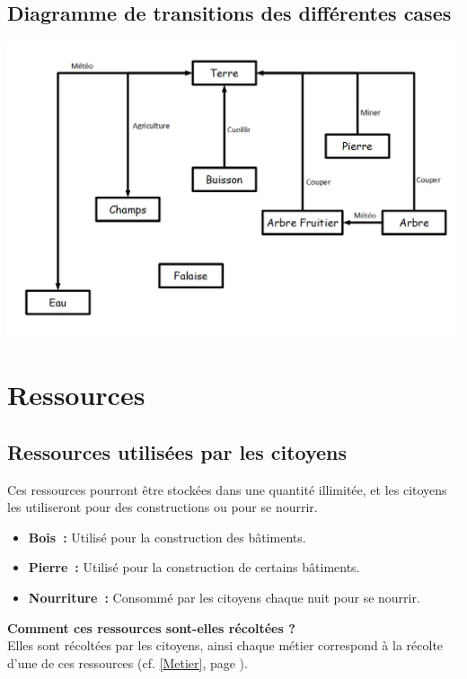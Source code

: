 \documentclass[a4paper]{article}
\begin{document}
      \subsection{Diagramme de transitions des différentes cases}
        \label{DiagCase}
        \begin{center}
          \includegraphics[scale=0.35]{DiagrammeTransitionCases.png} 
        \end{center}
        
    \section{Ressources}

      \subsection{Ressources utilisées par les citoyens}
        Ces ressources pourront être stockées dans une quantité illimitée, et les citoyens les utiliseront pour des constructions ou pour se nourrir.
        \begin{itemize} \small
          \item \textbf{Bois :} Utilisé pour la construction des bâtiments.
          \item \textbf{Pierre :} Utilisé pour la construction de certains bâtiments.
          \item \textbf{Nourriture :} Consommé par les citoyens chaque nuit pour se nourrir.
        \end{itemize} \normalsize
        \textbf{Comment ces ressources sont-elles récoltées ? }\\Elles sont récoltées par les citoyens, ainsi chaque métier correspond à la récolte d'une de ces ressources (cf. \ref{Metier}, page \pageref{Metier}).
\end{document}
